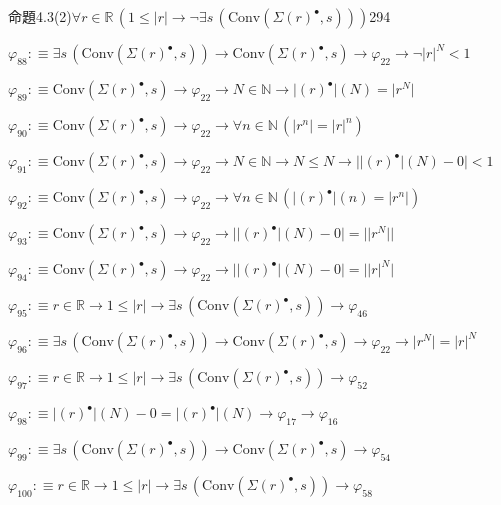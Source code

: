 \begin{fullproof}{命題4.3(2)}{$\forall r \in \mathbb{R}\,(1 \leq \lvert r \rvert \to \neg \exists s\,(\mathrm{Conv}(\Sigma {(r)^{\bullet}},s)))$}{294}
\begin{abbrevlist}
\item $\varphi_{88} :\equiv \exists s\,(\mathrm{Conv}(\Sigma {(r)^{\bullet}},s)) \to \mathrm{Conv}(\Sigma {(r)^{\bullet}},s) \to \varphi_{22} \to \neg {{\lvert r \rvert}^{N}} < 1$
\item $\varphi_{89} :\equiv \mathrm{Conv}(\Sigma {(r)^{\bullet}},s) \to \varphi_{22} \to N \in \mathbb{N} \to \lvert {(r)^{\bullet}} \rvert(N) = \lvert {{r}^{N}} \rvert$
\item $\varphi_{90} :\equiv \mathrm{Conv}(\Sigma {(r)^{\bullet}},s) \to \varphi_{22} \to \forall n \in \mathbb{N}\,(\lvert {{r}^{n}} \rvert = {{\lvert r \rvert}^{n}})$
\item $\varphi_{91} :\equiv \mathrm{Conv}(\Sigma {(r)^{\bullet}},s) \to \varphi_{22} \to N \in \mathbb{N} \to N \leq N \to \lvert \lvert {(r)^{\bullet}} \rvert(N) - 0 \rvert < 1$
\item $\varphi_{92} :\equiv \mathrm{Conv}(\Sigma {(r)^{\bullet}},s) \to \varphi_{22} \to \forall n \in \mathbb{N}\,(\lvert {(r)^{\bullet}} \rvert(n) = \lvert {{r}^{n}} \rvert)$
\item $\varphi_{93} :\equiv \mathrm{Conv}(\Sigma {(r)^{\bullet}},s) \to \varphi_{22} \to \lvert \lvert {(r)^{\bullet}} \rvert(N) - 0 \rvert = \lvert \lvert {{r}^{N}} \rvert \rvert$
\item $\varphi_{94} :\equiv \mathrm{Conv}(\Sigma {(r)^{\bullet}},s) \to \varphi_{22} \to \lvert \lvert {(r)^{\bullet}} \rvert(N) - 0 \rvert = \lvert {{\lvert r \rvert}^{N}} \rvert$
\item $\varphi_{95} :\equiv r \in \mathbb{R} \to 1 \leq \lvert r \rvert \to \exists s\,(\mathrm{Conv}(\Sigma {(r)^{\bullet}},s)) \to \varphi_{46}$
\item $\varphi_{96} :\equiv \exists s\,(\mathrm{Conv}(\Sigma {(r)^{\bullet}},s)) \to \mathrm{Conv}(\Sigma {(r)^{\bullet}},s) \to \varphi_{22} \to \lvert {{r}^{N}} \rvert = {{\lvert r \rvert}^{N}}$
\item $\varphi_{97} :\equiv r \in \mathbb{R} \to 1 \leq \lvert r \rvert \to \exists s\,(\mathrm{Conv}(\Sigma {(r)^{\bullet}},s)) \to \varphi_{52}$
\item $\varphi_{98} :\equiv \lvert {(r)^{\bullet}} \rvert(N) - 0 = \lvert {(r)^{\bullet}} \rvert(N) \to \varphi_{17} \to \varphi_{16}$
\item $\varphi_{99} :\equiv \exists s\,(\mathrm{Conv}(\Sigma {(r)^{\bullet}},s)) \to \mathrm{Conv}(\Sigma {(r)^{\bullet}},s) \to \varphi_{54}$
\item $\varphi_{100} :\equiv r \in \mathbb{R} \to 1 \leq \lvert r \rvert \to \exists s\,(\mathrm{Conv}(\Sigma {(r)^{\bullet}},s)) \to \varphi_{58}$

\end{abbrevlist}
\end{fullproof}
